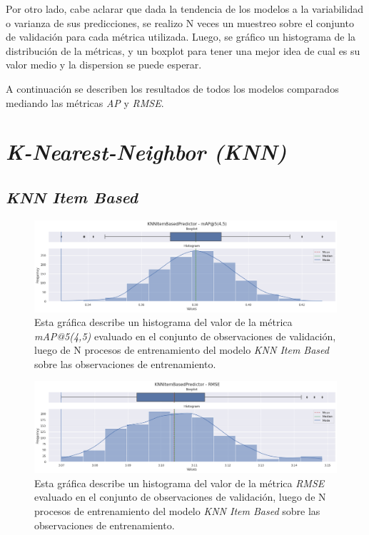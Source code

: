 \documentclass[11pt,a4paper,twoside]{thesis}
\begin{document}
Por otro lado, cabe aclarar que dada la tendencia de los modelos a la
variabilidad o varianza de sus predicciones, se realizo N veces un muestreo
sobre el conjunto de validación para cada métrica utilizada. Luego, se gráfico
un histograma de la distribución de la métricas, y un boxplot para tener una
mejor idea de cual es su valor medio y la dispersion se puede esperar.

A continuación se describen los resultados de todos los modelos comparados
mediando las métricas \textit{AP\makeatletter@k} y \textit{RMSE}.

\section{\textit{K-Nearest-Neighbor (KNN)}}

\subsection{\textit{KNN Item Based}}

\begin{figure}[!htb]
	\centering
	\includegraphics[width=15cm]{./images/metrics-knn-item-based-mapk.png}
	\caption{Esta gráfica describe un histograma del valor de la métrica \textit{mAP@5(4,5)} evaluado en el conjunto de observaciones de validación, luego de N procesos de entrenamiento del modelo \textit{KNN Item Based} sobre las observaciones de entrenamiento.}
\end{figure}

\clearpage

\begin{figure}[!htb]
	\centering
	\includegraphics[width=15cm]{./images/metrics-knn-item-based-RMSE.png}
	\caption{Esta gráfica describe un histograma del valor de la métrica \textit{RMSE} evaluado en el conjunto de observaciones de validación, luego de N procesos de entrenamiento del modelo \textit{KNN Item Based} sobre las observaciones de entrenamiento.}
\end{figure}
\end{document}
